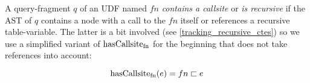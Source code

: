 
A query-fragment $q$ of an UDF named $fn$ \textit{contains a callsite} or \textit{is recursive} if the AST of $q$ contains a node with a call to the $fn$ itself or references a recursive table-variable. The latter is a bit involved (see \autoref{tracking_recursive_ctes}) so we use a simplified variant of $\operatorname{\text{hasCallsite}_{fn}}$ for the beginning that does not take references into account:

$$\operatorname{\text{hasCallsite}_{fn}}(e) = fn \sqsubset e$$





